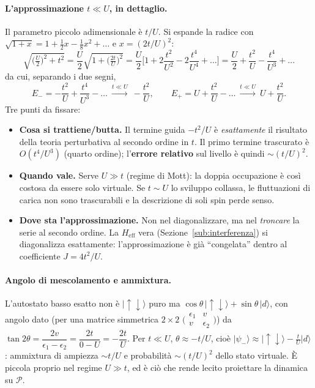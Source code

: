 \documentclass[11pt,a4paper]{article}
\newcommand{\ket}[1]{\lvert #1 \rangle}
\newcommand{\up}{\uparrow}
\newcommand{\dn}{\downarrow}
\newcommand{\Heff}{H_{\mathrm{eff}}}
\theoremstyle{definition}
\theoremstyle{remark}
\begin{document}
\paragraph{L'approssimazione $t\ll U$, in dettaglio.} Il parametro piccolo adimensionale è $t/U$. Si
espande la radice con $\sqrt{1+x}=1+\tfrac12 x-\tfrac18 x^2+\dots$ e $x=(2t/U)^2$:
\begin{equation}
\sqrt{\Big(\tfrac{U}{2}\Big)^2+t^2}=\frac{U}{2}\sqrt{1+\Big(\tfrac{2t}{U}\Big)^2}
=\frac{U}{2}\Big[1+2\frac{t^2}{U^2}-2\frac{t^4}{U^4}+\dots\Big]
=\frac{U}{2}+\frac{t^2}{U}-\frac{t^4}{U^3}+\dots
\end{equation}
da cui, separando i due segni,
\begin{equation}
E_-=-\frac{t^2}{U}+\frac{t^4}{U^3}-\dots\ \xrightarrow{t\ll U}\ -\frac{t^2}{U},\qquad
E_+=U+\frac{t^2}{U}-\dots\ \xrightarrow{t\ll U}\ U+\frac{t^2}{U}.
\label{eq:Epm-approx}
\end{equation}
Tre punti da fissare:
\begin{itemize}[nosep]
\item \textbf{Cosa si trattiene/butta.} Il termine guida $-t^2/U$ è \emph{esattamente} il risultato della
teoria perturbativa al secondo ordine in $t$. Il primo termine trascurato è $O(t^4/U^3)$ (quarto ordine);
l'\textbf{errore relativo} sul livello è quindi $\sim(t/U)^2$.
\item \textbf{Quando vale.} Serve $U\gg t$ (regime di Mott): la doppia occupazione è così costosa da essere
solo virtuale. Se $t\sim U$ lo sviluppo collassa, le fluttuazioni di carica non sono trascurabili e la
descrizione di soli spin perde senso.
\item \textbf{Dove sta l'approssimazione.} Non nel diagonalizzare, ma nel \emph{troncare} la serie al
secondo ordine. La $\Heff$ vera (Sezione~\ref{sub:interferenza}) si diagonalizza esattamente: l'approssimazione
è già ``congelata'' dentro al coefficiente $J=4t^2/U$.
\end{itemize}

\paragraph{Angolo di mescolamento e ammixtura.} L'autostato basso esatto non è $\ket{\up\dn}$ puro ma
$\cos\theta\,\ket{\up\dn}+\sin\theta\,\ket{d}$, con angolo dato (per una matrice simmetrica
$2\times2$ $\big(\begin{smallmatrix}\epsilon_1 & v\\ v & \epsilon_2\end{smallmatrix}\big)$) da
$\tan2\theta=\dfrac{2v}{\epsilon_1-\epsilon_2}=\dfrac{2t}{0-U}=-\dfrac{2t}{U}$. Per $t\ll U$,
$\theta\approx-t/U$, cioè $\ket{\psi_-}\approx\ket{\up\dn}-\tfrac{t}{U}\ket{d}$: ammixtura di ampiezza
$\sim t/U$ e probabilità $\sim(t/U)^2$ dello stato virtuale. È piccola proprio nel regime $U\gg t$, ed è
ciò che rende lecito proiettare la dinamica su $\mathcal P$.
\end{document}
